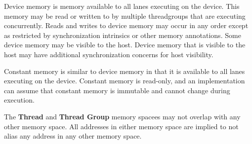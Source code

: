 \p Device memory is memory available to all \gls{lane}s executing on the device.
This memory may be read or written to by multiple \gls{threadgroup}s that are
executing concurrently. Reads and writes to device memory may occur in any order
except as restricted by synchronization intrinsics or other memory annotations.
Some device memory may be visible to the host. Device memory that is visible to
the host may have additional synchronization concerns for host visibility.


\p Constant memory is similar to device memory in that it is available to all
\gls{lane}s executing on the device. Constant memory is read-only, and an
implementation can assume that constant memory is immutable and cannot change
during execution.


\p The \textbf{Thread} and \textbf{Thread Group} memory spacees may not overlap
with any other memory space. All addresses in either memory space are implied to
not alias any address in any other memory space.
